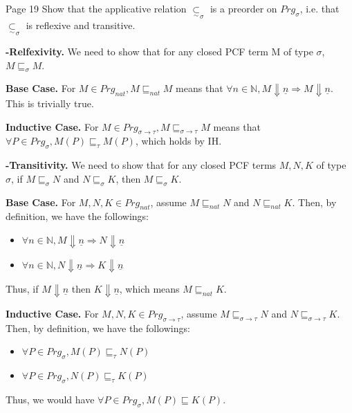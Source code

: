 \begin{problem}{Page 19}
    Show that the applicative relation $ \underset{\sim}{\subset}_\sigma $ is a preorder on $Prg_\sigma$, i.e. that $ \underset{\sim}{\subset}_\sigma $ is reflexive and transitive.
\end{problem}

\begin{solution}
    
\textbf{-Relfexivity.}
We need to show that for any closed PCF term M of type $\sigma$, $M \sqsubseteq_\sigma M$.

\textbf{Base Case.} For $ M \in Prg_{nat}, M \sqsubseteq_{nat} M $ means that $\forall n \in \mathbb{N}, M \Downarrow \underline{n} \Rightarrow M \Downarrow \underline{n} $. This is trivially true.

\textbf{Inductive Case.} For $ M \in Prg_{\sigma \to \tau}, M \sqsubseteq_{\sigma \to \tau} M $ means that $ \forall P \in Prg_\sigma, M(P) \sqsubseteq_\tau M(P) $, which holds by IH.

\textbf{-Transitivity.} We need to show that for any closed PCF terms $ M, N, K $ of type $\sigma$, if $ M \sqsubseteq_\sigma N $ and $ N \sqsubseteq_\sigma K $, then $ M \sqsubseteq_\sigma K $.

\textbf{Base Case.} For $M, N, K \in Prg_{nat} $, assume $ M \sqsubseteq_{nat} N $ and $ N \sqsubseteq_{nat} K $. Then, by definition, we have the followings:

\begin{itemize}
    \item $ \forall n \in \mathbb{N}, M \Downarrow \underline{n} \Rightarrow N \Downarrow \underline{n} $
    \item $ \forall n \in \mathbb{N}, N \Downarrow \underline{n} \Rightarrow K \Downarrow \underline{n} $
\end{itemize}
Thus, if $ M \Downarrow \underline{n} $ then $ K \Downarrow \underline{n} $, which means $ M \sqsubseteq_{nat} K $.

\textbf{Inductive Case.} For $ M, N, K \in Prg_{\sigma \to \tau} $, assume $ M \sqsubseteq_{\sigma \to \tau} N $ and $ N \sqsubseteq_{\sigma \to \tau} K $. Then, by definition, we have the followings:

\begin{itemize}
    \item $ \forall P \in Prg_\sigma, M(P) \sqsubseteq_\tau N(P) $ 
    \item $ \forall P \in Prg_\sigma, N(P) \sqsubseteq_\tau K(P) $ 
\end{itemize}
Thus, we would have $ \forall P \in Prg_\sigma, M(P) \sqsubseteq K(P) $.
\end{solution}